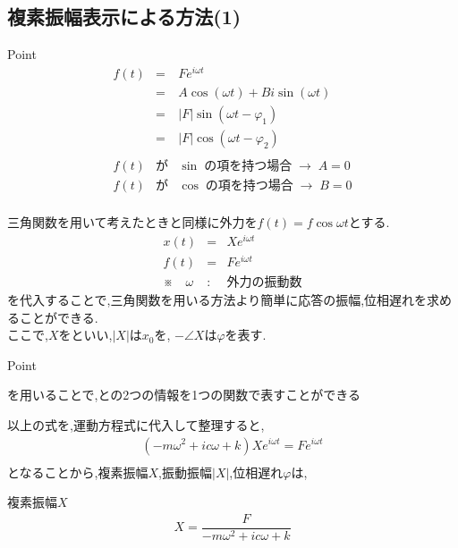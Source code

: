 \documentclass[a4paper]{jsarticle}
\begin{document}
\subsection{複素振幅表示による方法(1)}
\begin{itembox}[l]{Point}
    \begin{eqnarray*}
        f\left(t\right)
        &=&Fe^{i\omega t}\\
        &=&A\cos\left(\omega t\right)+Bi\sin\left(\omega t\right)\\
        &=&|F|\sin\left(\omega t -\varphi_1\right)\\
        &=&|F|\cos\left(\omega t -\varphi_2\right)\\
        \\
        f\left(t\right) &が& \sin\; の項を持つ場合\; \rightarrow \; A=0\\
        f\left(t\right) &が& \cos\; の項を持つ場合\; \rightarrow \; B=0\\
    \end{eqnarray*}
\end{itembox}
三角関数を用いて考えたときと同様に外力を$f\left(t\right)=f\cos\omega t$とする.
\begin{eqnarray*}
    x\left(t\right)&=&Xe^{i\omega t}\\
    f\left(t\right)&=&Fe^{i\omega t}\\
    ※\quad\omega &:& 外力の振動数
\end{eqnarray*}
を代入することで,三角関数を用いる方法より簡単に応答の振幅,位相遅れを求めることができる.\\
ここで,$X$をといい,$|X|$は$x_0$を,
$-\angle X$は$\varphi$を表す.\\
\begin{itembox}[l]{Point}
    \begin{center}
        を用いることで,との2つの情報を1つの関数で表すことができる
    \end{center}
\end{itembox}
以上の式を,運動方程式に代入して整理すると,\\
\begin{eqnarray*}
    \left(-m\omega^2+ic\omega+k\right)Xe^{i\omega t}=Fe^{i\omega t}\\
\end{eqnarray*}
となることから,複素振幅$X$,振動振幅$|X|$,位相遅れ$\varphi$は,
\begin{itembox}[l]{複素振幅$X$}
    \begin{eqnarray*}
        X=\dfrac{F}{-m\omega^2+ic\omega+k}\\
    \end{eqnarray*}
\end{itembox}
\end{document}
